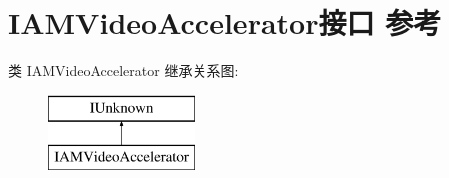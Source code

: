 \hypertarget{interface_i_a_m_video_accelerator}{}\section{I\+A\+M\+Video\+Accelerator接口 参考}
\label{interface_i_a_m_video_accelerator}
类 I\+A\+M\+Video\+Accelerator 继承关系图\+:\begin{figure}[H]
\begin{center}
\leavevmode
\includegraphics[height=2.000000cm]{interface_i_a_m_video_accelerator}
\end{center}
\end{figure}
